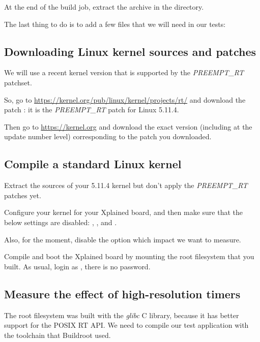 At the end of the build job, extract the
 archive in the 
directory.

The last thing to do is to add a few files that we will need in our
tests:


\subsection{Downloading Linux kernel sources and patches}

We will use a recent kernel version that is supported by the {\em
  PREEMPT\_RT} patchset.

So, go to \url{https://kernel.org/pub/linux/kernel/projects/rt/} and
download the patch : it is the {\em
  PREEMPT\_RT} patch for Linux 5.11.4.

Then go to \url{https://kernel.org} and download the exact version
(including at the update number level) corresponding to the patch you
downloaded.

\subsection{Compile a standard Linux kernel}

Extract the sources of your 5.11.4 kernel but don't apply the {\em
  PREEMPT\_RT} patches yet.

Configure your kernel for your Xplained board, and then make sure
that the below settings are disabled:
, ,
 and .

Also, for the moment, disable the 
option which impact we want to measure.

Compile and boot the Xplained board by mounting the root filesystem that you
built. As usual, login as , there is no password.

\subsection{Measure the effect of high-resolution timers}

The root filesystem was built with the {\em glibc} C library, because
it has better support for the POSIX RT API. We need to compile our
test application with the toolchain that Buildroot used.

